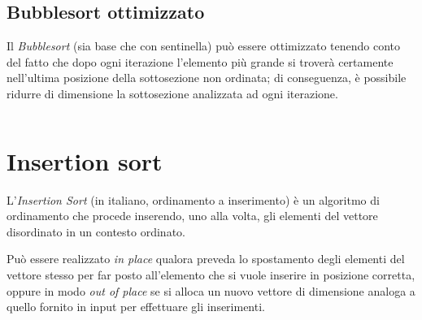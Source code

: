  \inputminted[firstline=37,lastline=60]{cpp}{./src/main/cpp/Bubble.cpp}

  \clearpage

  \subsection{Bubblesort ottimizzato}\label{subsec:bubble:opt}

  Il \textit{Bubblesort} (sia base che con sentinella) può essere ottimizzato tenendo conto del fatto che
  dopo ogni iterazione l'elemento più grande si troverà certamente nell'ultima posizione della sottosezione
  non ordinata; di conseguenza, è possibile ridurre di dimensione la sottosezione analizzata ad ogni iterazione.

  \inputminted[firstline=20,lastline=36]{cpp}{./src/main/cpp/Bubble.cpp}

  \clearpage

  \section{Insertion sort}\label{sec:insertion}

  L'\textit{Insertion Sort} (in italiano, ordinamento a inserimento) è un algoritmo di ordinamento
  che procede inserendo, uno alla volta, gli elementi del vettore disordinato in un contesto ordinato.

  Può essere realizzato \textit{in place} qualora preveda lo spostamento degli elementi del vettore stesso
  per far posto all'elemento che si vuole inserire in posizione corretta, oppure in modo \textit{out of place}
  se si alloca un nuovo vettore di dimensione analoga a quello fornito in input per effettuare gli inserimenti.

  \inputminted[firstline=27,lastline=43]{cpp}{./src/main/cpp/Insertion.cpp}

  \clearpage

  \inputminted[firstline=3,lastline=26]{cpp}{./src/main/cpp/Insertion.cpp}


